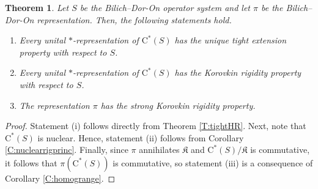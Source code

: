 \documentclass[10pt]{amsart}
\newcommand{\fK}{{\mathfrak{K}}}
\newcommand{\rC}{\mathrm{C}}
\newtheorem{theorem}[lemma]{Theorem}
\theoremstyle{definition}
\begin{document}
\begin{theorem}\label{T:BD}
Let $S$ be the Bilich--Dor-On operator system and let $\pi$ be the Bilich--Dor-On representation. Then, the following statements hold.
\begin{enumerate}[\rm (i)]
\item Every unital $*$-representation of $\rC^*(S)$ has the unique tight extension property with respect to $S$.
\item Every unital $*$-representation of $\rC^*(S)$ has the  Korovkin rigidity property with respect to $S$.
\item The representation $\pi$ has the strong Korovkin rigidity property.
\end{enumerate}
\end{theorem}
\begin{proof}
Statement (i) follows directly from Theorem \ref{T:tightHR}. Next, note that $\rC^*(S)$ is nuclear. Hence, statement (ii) follows from Corollary \ref{C:nuclearrigprinc}. Finally, since $\pi$ annihilates $\fK$ and $\rC^*(S)/\fK$ is commutative, it follows that $\pi(\rC^*(S))$ is commutative, so statement (iii) is a consequence of Corollary \ref{C:homogrange}.
\end{proof}




	
\end{document}
